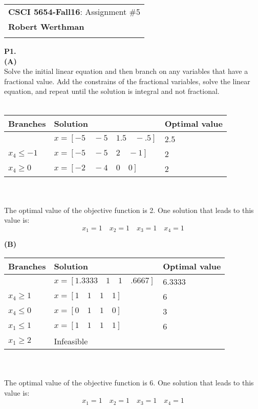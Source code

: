 \documentclass[11pt]{article}
\begin{document}
\begin{tabular}{l}
	\textbf{CSCI 5654-Fall16}: Assignment \#5 \\
	\textbf{Robert Werthman} \phantom{Supercalifragilisticexpialidocius Smith} \\
	\hline \\[10pt]
\end{tabular}

\noindent\textbf{P1.}
\\
\noindent\textbf{(A)}
\\
Solve the initial linear equation and then branch on any variables that have a fractional value.  Add the constrains of the fractional variables, solve the linear equation, and repeat until the solution is integral and not fractional.\\ \\
\begin{tabular}{|l|l|l|}
\hline
Branches & Solution & Optimal value \\ \hline
& $x = [-5\quad-5\quad1.5\quad-.5]$ & 2.5 \\ \hline
$x_4 \leq -1$ & $x = [-5\quad-5\quad2\quad-1]$ & 2\\ \hline
$x_4 \geq 0$ & $x = [-2\quad-4\quad0\quad0]$ & 2 \\ \hline
\end{tabular}
\\ \\
The optimal value of the objective function is 2.  One solution that leads to this value is: 
$$
x_1 = 1 \quad x_2 = 1 \quad x_3 = 1 \quad x_4 = 1
$$


\noindent\textbf{(B)}
\\
\begin{tabular}{|l|l|l|}
\hline
Branches & Solution & Optimal value \\ \hline
& $x = [1.3333\quad1\quad1\quad.6667]$ & 6.3333 \\ \hline
$x_4 \geq 1$ & $x = [1\quad1\quad1\quad1]$ & 6 \\ \hline
$x_4 \leq 0$ & $x = [0\quad1\quad1\quad0]$ & 3 \\ \hline
$x_1 \leq 1$ & $x = [1\quad1\quad1\quad1]$ & 6 \\ \hline
$x_1 \geq 2$ & Infeasible & \\ \hline
\end{tabular}
\\ \\
The optimal value of the objective function is 6.  One solution that leads to this value is:
$$
x_1 = 1 \quad x_2 = 1 \quad x_3 = 1 \quad x_4 = 1
$$
\end{document}
